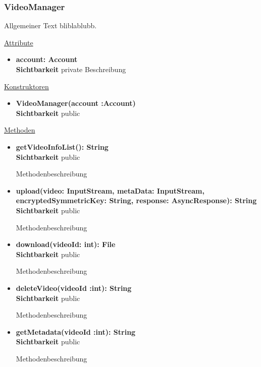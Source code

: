 \subsubsection{VideoManager} \label{service:klasse:VideoManager}
Allgemeiner Text bliblablubb. \newline

\underline{Attribute}
\begin{itemize}
\itemsep0pt
\item \textbf{account: Account} \hfill\\ 
\textbf{Sichtbarkeit} private 
Beschreibung

\end{itemize}

\underline{Konstruktoren}
\begin{itemize}
\itemsep0pt
\item \textbf{VideoManager(account :Account)} \hfill\\
\textbf{Sichtbarkeit} public
\end{itemize}

\underline{Methoden}
\begin{itemize}
\itemsep0pt
\item \textbf{getVideoInfoList(): String}\hfill\\
\textbf{Sichtbarkeit} public

Methodenbeschreibung

\item \textbf{upload(video: InputStream, metaData: InputStream,
encryptedSymmetricKey: String, response: AsyncResponse): String}\hfill\\
\textbf{Sichtbarkeit} public

Methodenbeschreibung

\item \textbf{download(videoId: int): File}\hfill\\
\textbf{Sichtbarkeit} public

Methodenbeschreibung

\item \textbf{deleteVideo(videoId :int): String}\hfill\\
\textbf{Sichtbarkeit} public

Methodenbeschreibung

\item \textbf{getMetadata(videoId :int): String}\hfill\\
\textbf{Sichtbarkeit} public

Methodenbeschreibung

\end{itemize}